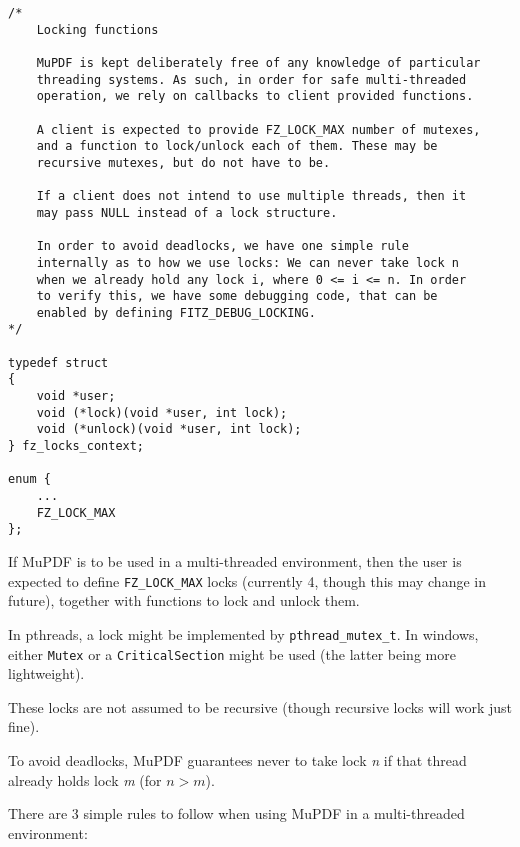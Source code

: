 \documentclass[oneside]{book}
\begin{document}
\begin{lstlisting}
/*
	Locking functions

	MuPDF is kept deliberately free of any knowledge of particular
	threading systems. As such, in order for safe multi-threaded
	operation, we rely on callbacks to client provided functions.

	A client is expected to provide FZ_LOCK_MAX number of mutexes,
	and a function to lock/unlock each of them. These may be
	recursive mutexes, but do not have to be.

	If a client does not intend to use multiple threads, then it
	may pass NULL instead of a lock structure.

	In order to avoid deadlocks, we have one simple rule
	internally as to how we use locks: We can never take lock n
	when we already hold any lock i, where 0 <= i <= n. In order
	to verify this, we have some debugging code, that can be
	enabled by defining FITZ_DEBUG_LOCKING.
*/

typedef struct
{
	void *user;
	void (*lock)(void *user, int lock);
	void (*unlock)(void *user, int lock);
} fz_locks_context;

enum {
    ...
	FZ_LOCK_MAX
};
\end{lstlisting}

If MuPDF is to be used in a multi-threaded environment, then the user is expected to define \texttt{FZ\_LOCK\_MAX} locks (currently 4, though this may change in future), together with functions to lock and unlock them.

In pthreads, a lock might be implemented by \texttt{pthread\_mutex\_t}. In windows, either \texttt{Mutex} or a \texttt{CriticalSection} might be used (the latter being more lightweight).

These locks are not assumed to be recursive (though recursive locks will work just fine).

To avoid deadlocks, MuPDF guarantees never to take lock \textit{n} if that thread already holds lock \textit{m} (for $n > m$).

There are 3 simple rules to follow when using MuPDF in a multi-threaded environment:
\end{document}
